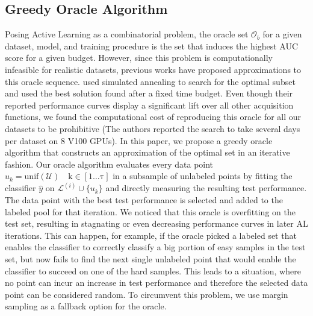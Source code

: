 \documentclass[]{article}
\begin{document}
\subsection{Greedy Oracle Algorithm}\label{sec:oracle}
Posing Active Learning as a combinatorial problem, the oracle set $\mathcal{O}_b$ for a given dataset, model, and training procedure is the set that induces the highest AUC score for a given budget.
However, since this problem is computationally infeasible for realistic datasets, previous works have proposed approximations to this oracle sequence. 
\cite{zhou2021towards} used simulated annealing to search for the optimal subset and used the best  solution found after a fixed time budget. 
Even though their reported performance curves display a significant lift over all other acquisition functions, we found the computational cost of reproducing this oracle for all our datasets to be prohibitive (The authors reported the search to take several days per dataset on 8 V100 GPUs).
In this paper, we propose a greedy oracle algorithm that constructs an approximation of the optimal set in an iterative fashion.
Our oracle algorithm evaluates every data point $u_k = \operatorname{unif(\mathcal{U}) \quad k \in [1 \ldots \tau]}$ in a subsample of unlabeled points by fitting the classifier $\hat y$ on $\mathcal{L}^{(i)} \cup \{u_k\}$ and directly measuring the resulting test performance.
The data point with the best test performance is selected and added to the labeled pool for that iteration.
We noticed that this oracle is overfitting on the test set, resulting in stagnating or even decreasing performance curves in later AL iterations.
This can happen, for example, if the oracle picked a labeled set that enables the classifier to correctly classify a big portion of easy samples in the test set, but now fails to find the next single unlabeled point that would enable the classifier to succeed on one of the hard samples.
This leads to a situation, where no point can incur an increase in test performance and therefore the selected data point can be considered random.
To circumvent this problem, we use margin sampling \cite{wang2014new} as a fallback option for the oracle.
\end{document}
